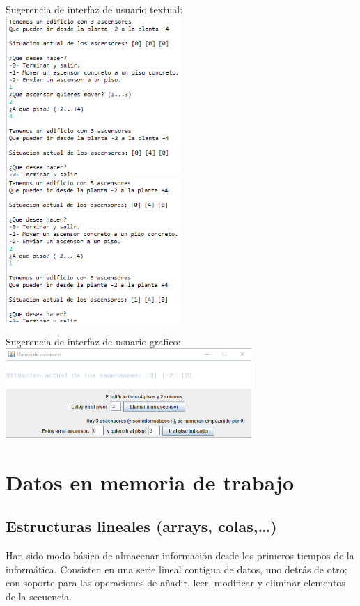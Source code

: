 \documentclass[spanish,12pt,a4paper,final,oneside]{book}
\begin{document}
Sugerencia de interfaz de usuario textual:
\\ \includegraphics[width=0.5\textwidth]{ascensores - pantallazo - textual1} 
\includegraphics[width=0.5\textwidth]{ascensores - pantallazo - textual2} 

Sugerencia de interfaz de usuario grafico:
\\ \includegraphics[width=0.7\textwidth]{ascensores - pantallazo - grafico1} 



\chapter{Datos en memoria de trabajo}


\section{Estructuras lineales (arrays, colas,\ldots)}
Han sido modo básico de almacenar información desde los primeros tiempos de la informática. Consisten en una serie lineal contigua de datos, uno detrás de otro; con soporte para las operaciones de añadir, leer, modificar y eliminar elementos de la secuencia.
\end{document}
